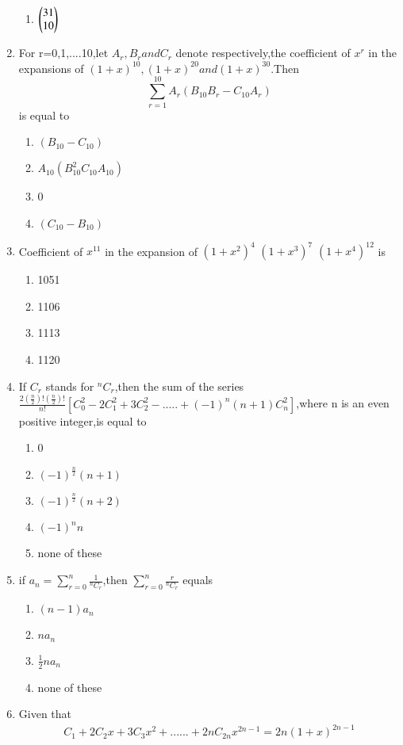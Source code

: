 \begin{enumerate}[label=\arabic*.,ref=\thesubsection.\theenumi]
\begin{enumerate}
\item $\begin{pmatrix}31\\10\end{pmatrix}$
\end{enumerate}
 \item For r=0,1,....10,let $A_r,B_r and C_r$ denote respectively,the coefficient of $x^r$ in the expansions of $(1+x)^{10},(1+x)^{20} and (1+x)^{30}$.Then $$\sum_{r=1}^{10} A_r(B_{10}B_r-C_{10}A_r)$$ is equal to
 \begin{enumerate}
 \item $(B_{10}-C_{10})$
 \item $A_{10}(B^2_{10} C_{10} A_{10})$
 \item 0
 \item $(C_{10}-B_{10})$
 \end{enumerate}
 \item Coefficient of $x^{11}$ in the expansion of $(1+x^2)^4$ $(1+x^3)^7$ $(1+x^4)^{12}$ is
 \begin{enumerate}
     \item 1051
     \item 1106
     \item 1113
     \item 1120
 \end{enumerate}
\item If $C_r$ stands for $^{n}C_r$,then the sum of the series $\frac{2(\frac{n}{2})!(\frac{n}{2})!}{n!}[C^2_0-2C^2_1+3C^2_2-.....+(-1)^n(n+1)C^2_n]$,where n is an even positive integer,is equal to 
\begin{enumerate}
    \item 0
    \item $(-1)^\frac{n}{2}(n+1)$
    \item $(-1)^\frac{n}{2}(n+2)$
    \item $(-1)^n n$
    \item none of these
\end{enumerate}
\item if $a_n=\sum_{r=0}^{n} \frac{1}{^{n}C_r}$,then $\sum_{r=0}^{n} \frac{r}{^{n}C_r}$ equals
\begin{enumerate}
    \item $(n-1)a_n$
    \item $na_n$
    \item $\frac{1}{2}na_n$
    \item none of these 
\end{enumerate}
\item Given that 
\begin{align}
C_1+2C_2x+3C_3x^2+......+2nC_{2n}x^{2n-1}=2n(1+x)^{2n-1}

\end{align}
\end{enumerate}
